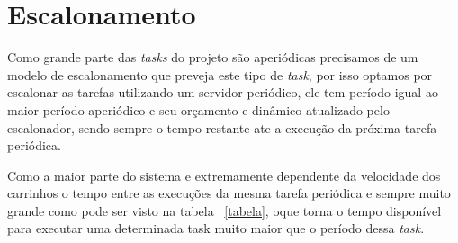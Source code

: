 \documentclass{abnt}
\begin{document}
\section{Escalonamento}
    Como grande parte das \textit{tasks} do projeto são aperiódicas precisamos
    de um modelo de escalonamento que preveja este tipo de \textit{task}, por
    isso optamos por escalonar as tarefas utilizando um servidor periódico, ele
    tem período igual ao maior período aperiódico e seu orçamento e dinâmico
    atualizado pelo escalonador, sendo sempre  o tempo restante ate a execução
    da próxima tarefa periódica.

    Como a maior parte do sistema e extremamente dependente da velocidade dos
    carrinhos o tempo entre as execuções da mesma tarefa periódica e sempre
    muito grande como pode ser visto na tabela ~\ref{tabela}, oque torna o tempo disponível para executar uma determinada
    task muito maior que o período dessa \textit{task}.
\end{document}
